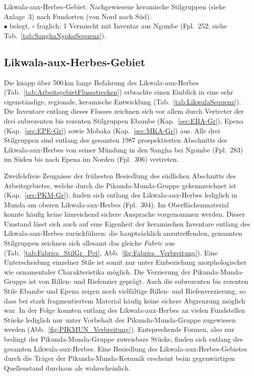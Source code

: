 \begin{table*}[!tb]
	\centering
	{\footnotesize 
		
	}
	\caption{Likwala-aux-Herbes-Gebiet: Nachgewiesene keramische Stilgruppen (siehe Anlage~3) nach Fundorten (von Nord nach Süd).\\$\bullet$ belegt, $\circ$ fraglich; 1 Vermischt mit Inventar aus Ngombe (Fpl.~252; siehe Tab.~\ref{tab:SanghaNgokoSequenz}).}
	\label{tab:LikwalaSequenz}
\end{table*}

\subsection{Likwala-aux-Herbes-Gebiet}\label{sec:SequenzLikwala}

Die knapp über 500\,km lange Befahrung des \mbox{Likwala}-\mbox{aux}-\mbox{Herbes} (Tab.~\ref{tab:ArbeitsgebietFlussstrecken}) erbrachte einen Einblick in eine sehr eigenständige, regionale, keramische Entwicklung (Tab.~\ref{tab:LikwalaSequenz}). Die Inventare entlang dieses Flusses zeichnen sich vor allem durch Vertreter der drei subrezenten bis rezenten Stilgruppen Ebambe (Kap.~\ref{sec:EBA-Gr}), Epena (Kap.~\ref{sec:EPE-Gr}) sowie Mobaka (Kap.~\ref{sec:MKA-Gr}) aus. Alle drei Stilgruppen sind entlang des gesamten 1987 prospektierten Abschnitts des \mbox{Likwala}-\mbox{aux}-\mbox{Herbes} von seiner Mündung in den \mbox{Sangha} bei Ngombe (Fpl.~283) im Süden bis nach Epena im Norden (Fpl.~306) vertreten.

Zweifelsfreie Zeugnisse der frühesten Besiedlung des südlichen Abschnitts des Arbeitsgebietes, welche durch die Pikunda-Munda-Gruppe gekennzeichnet ist (Kap.~\ref{sec:PKM-Gr}), finden sich entlang des \mbox{Likwala}-\mbox{aux}-\mbox{Herbes} lediglich in Munda am oberen \mbox{Likwala}-\mbox{aux}-\mbox{Herbes} (Fpl.~304). Im Oberflächenmaterial konnte häufig keine hinreichend sichere Ansprache vorgenommen werden. Dieser Umstand lässt sich auch auf eine Eigenheit der keramischen Inventare entlang des \mbox{Likwala}-\mbox{aux}-\mbox{Herbes} zurückführen: die hauptsächlich anzutreffenden, genannten Stilgruppen zeichnen sich allesamt das gleiche \textit{Fabric} aus (Tab.~\ref{tab:Fabrics_StilGr_Pct}, Abb.~\ref{fig:Fabrics_Verbreitung}). Eine Unterscheidung einzelner Stile ist somit nur unter Einbeziehung morphologischer wie ornamentaler Charakteristika möglich. Die Verzierung der Pikunda-Munda-Gruppe ist von Rillen- und Riefenzier geprägt. Auch die subrezenten bis rezenten Stile Ebambe und Epena zeigen noch vielfältige Rillen- und Riefenverzierung, so dass bei stark fragmentiertem Material häufig keine sichere Abgrenzung möglich war. In der Folge konnten entlang des \mbox{Likwala}-\mbox{aux}-\mbox{Herbes} an vielen Fundstellen Stücke lediglich nur unter Vorbehalt der Pikunda-Munda-Gruppe zugewiesen werden (Abb.~\ref{fig:PIKMUN_Verbreitung}). Entsprechende Formen, also nur bedingt der Pikunda-Munda-Gruppe zuweisbare Stücke, finden sich entlang des gesamten \mbox{Likwala}-\mbox{aux}-\mbox{Herbes}. Eine Besiedlung des \mbox{Likwala}-\mbox{aux}-\mbox{Herbes}-Gebietes durch die Träger der Pikunda-Munda-Keramik erscheint beim gegenwärtigen Quellenstand durchaus als wahrscheinlich. 

